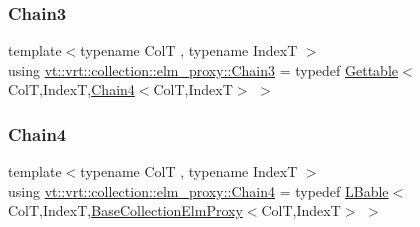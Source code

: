 \subsubsection{\texorpdfstring{Chain3}{Chain3}}
{\footnotesize\ttfamily template$<$typename ColT , typename IndexT $>$ \\
using \hyperlink{namespacevt_1_1vrt_1_1collection_1_1elm__proxy_a8db2caa0e0d4bb8dafc382c8953b2574}{vt\+::vrt\+::collection\+::elm\+\_\+proxy\+::\+Chain3} = typedef \hyperlink{structvt_1_1vrt_1_1collection_1_1_gettable}{Gettable}$<$ColT,IndexT,\hyperlink{namespacevt_1_1vrt_1_1collection_1_1elm__proxy_ad02b3ccfc141a64eb83d8481f89a91c5}{Chain4}$<$ColT,IndexT$>$ $>$}

\mbox{\label{namespacevt_1_1vrt_1_1collection_1_1elm__proxy_ad02b3ccfc141a64eb83d8481f89a91c5}} 
\subsubsection{\texorpdfstring{Chain4}{Chain4}}
{\footnotesize\ttfamily template$<$typename ColT , typename IndexT $>$ \\
using \hyperlink{namespacevt_1_1vrt_1_1collection_1_1elm__proxy_ad02b3ccfc141a64eb83d8481f89a91c5}{vt\+::vrt\+::collection\+::elm\+\_\+proxy\+::\+Chain4} = typedef \hyperlink{structvt_1_1vrt_1_1collection_1_1_l_bable}{L\+Bable}$<$ColT,IndexT,\hyperlink{structvt_1_1vrt_1_1collection_1_1_base_collection_elm_proxy}{Base\+Collection\+Elm\+Proxy}$<$ColT,IndexT$>$ $>$}

